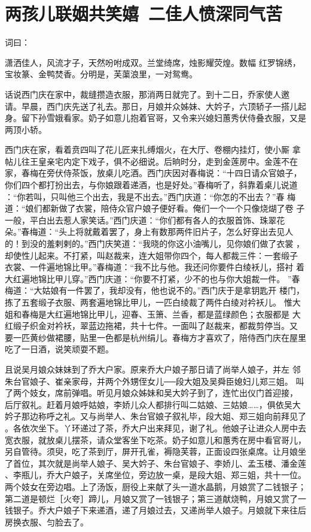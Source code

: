 \chapter{两孩儿联姻共笑嬉~二佳人愤深同气苦}

词曰：

潇洒佳人，风流才子，天然吩咐成双。兰堂绮席，烛影耀荧煌。数幅
红罗锦绣，宝妆篆、金鸭焚香。分明是，芙蕖浪里，一对鸳鸯。

话说西门庆在家中，裁缝攒造衣服，那消两日就完了。到十二日，乔家使人邀
请。早晨，西门庆先送了礼去。那日，月娘并众姊妹、大妗子，六顶轿子一搭儿起
身。留下孙雪娥看家。奶子如意儿抱着官哥，又令来兴媳妇蕙秀伏侍叠衣服，又是
两顶小轿。

西门庆在家，看着贲四叫了花儿匠来扎缚烟火，在大厅、卷棚内挂灯，使小厮
拿帖儿往王皇亲宅内定下戏子，俱不必细说。后晌时分，走到金莲房中。金莲不在
家，春梅在旁伏侍茶饭，放桌儿吃酒。西门庆因对春梅说：“十四日请众官娘子，
你们四个都打扮出去，与你娘跟着递酒，也是好处。”春梅听了，斜靠着桌儿说道
：“你若叫，只叫他三个出去，我是不出去。”西门庆道：“你怎的不出去？”春
梅道：“娘们都新做了衣裳，陪侍众官户娘子便好看。俺们一个一个只像烧煳了卷
子一般，平白出去惹人家笑话。”西门庆道：“你们都有各人的衣服首饰、珠翠花
朵。”春梅道：“头上将就戴着罢了，身上有数那两件旧片子，怎么好穿出去见人
的！到没的羞剌剌的。”西门庆笑道：“我晓的你这小油嘴儿，见你娘们做了衣裳
，却使性儿起来。不打紧，叫赵裁来，连大姐带你四个，每人都裁三件：一套缎子
衣裳、一件遍地锦比甲。”春梅道：“我不比与他。我还问你要件白绫袄儿，搭衬
着大红遍地锦比甲儿穿。”西门庆道：“你要不打紧，少不的也与你大姐裁一件。
”春梅道：“大姑娘有一件罢了，我却没有，他也说不的。”西门庆于是拿钥匙开
楼门，拣了五套缎子衣服、两套遍地锦比甲儿，一匹白绫裁了两件白绫对衿袄儿。
惟大姐和春梅是大红遍地锦比甲儿，迎春、玉箫、兰香，都是蓝绿颜色；衣服都是
大红缎子织金对衿袄，翠蓝边拖裙，共十七件。一面叫了赵裁来，都裁剪停当。又
要一匹黄纱做裙腰，贴里一色都是杭州绢儿。春梅方才喜欢了，陪侍西门庆在屋里
吃了一日酒，说笑顽耍不题。

且说吴月娘众妹妹到了乔大户家。原来乔大户娘子那日请了尚举人娘子，并左
邻朱台官娘子、崔亲家母，并两个外甥侄女儿──段大姐及吴舜臣媳妇儿郑三姐。
叫了两个妓女，席前弹唱。听见月娘众姊妹和吴大妗子到了，连忙出仪门首迎接，
后厅叙礼。赶着月娘呼姑娘，李娇儿众人都排行叫二姑娘、三姑娘……，俱依吴大
妗子那边称呼之礼。又与尚举人、朱台官娘子叙礼毕，段大姐、郑三姐向前拜见了
。各依次坐下。丫环递过了茶，乔大户出来拜见，谢了礼。他娘子让进众人房中去
宽衣服，就放桌儿摆茶，请众堂客坐下吃茶。奶子如意儿和蕙秀在房中看官哥儿，
另自管待。须臾，吃了茶到厅，屏开孔雀，褥隐芙蓉，正面设四张桌席。让月娘坐
了首位，其次就是尚举人娘子、吴大妗子、朱台官娘子、李娇儿、孟玉楼、潘金莲
、李瓶儿，乔大户娘子，关席坐位，旁边放一桌，是段大姐、郑三姐，共十一位。
两个妓女在旁边唱。上了汤饭，厨役上来献了头一道水晶鹅，月娘赏了二钱银子；
第二道是顿烂［火夸］蹄儿，月娘又赏了一钱银子；第三道献烧鸭，月娘又赏了一
钱银子。乔大户娘子下来递酒，递了月娘过去，又递尚举人娘子。月娘就下来往后
房换衣服、匀脸去了。

